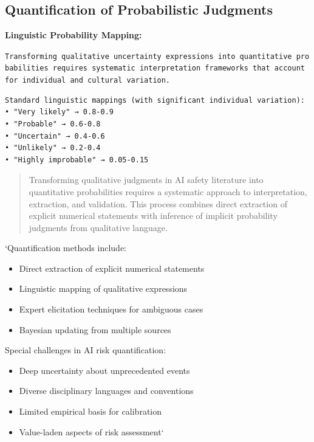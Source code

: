 \documentclass[
  11pt,
  letterpaper,
]{book}
\providecommand{\tightlist}{%
  \setlength{\itemsep}{0pt}\setlength{\parskip}{0pt}}
\begin{document}
\subsection{Quantification of Probabilistic
Judgments}\label{sec-quantification}

\textbf{Linguistic Probability Mapping:}

\texttt{Transforming\ qualitative\ uncertainty\ expressions\ into\ quantitative\ probabilities\ requires\ systematic\ interpretation\ frameworks\ that\ account\ for\ individual\ and\ cultural\ variation.}

\begin{verbatim}
Standard linguistic mappings (with significant individual variation):
• "Very likely" → 0.8-0.9
• "Probable" → 0.6-0.8  
• "Uncertain" → 0.4-0.6
• "Unlikely" → 0.2-0.4
• "Highly improbable" → 0.05-0.15
\end{verbatim}

\begin{quote}
Transforming qualitative judgments in AI safety literature into
quantitative probabilities requires a systematic approach to
interpretation, extraction, and validation. This process combines direct
extraction of explicit numerical statements with inference of implicit
probability judgments from qualitative language.
\end{quote}

`Quantification methods include:

\begin{itemize}
\tightlist
\item
  Direct extraction of explicit numerical statements
\item
  Linguistic mapping of qualitative expressions
\item
  Expert elicitation techniques for ambiguous cases
\item
  Bayesian updating from multiple sources
\end{itemize}

Special challenges in AI risk quantification:

\begin{itemize}
\tightlist
\item
  Deep uncertainty about unprecedented events
\item
  Diverse disciplinary languages and conventions
\item
  Limited empirical basis for calibration
\item
  Value-laden aspects of risk assessment`
\end{itemize}
\end{document}
